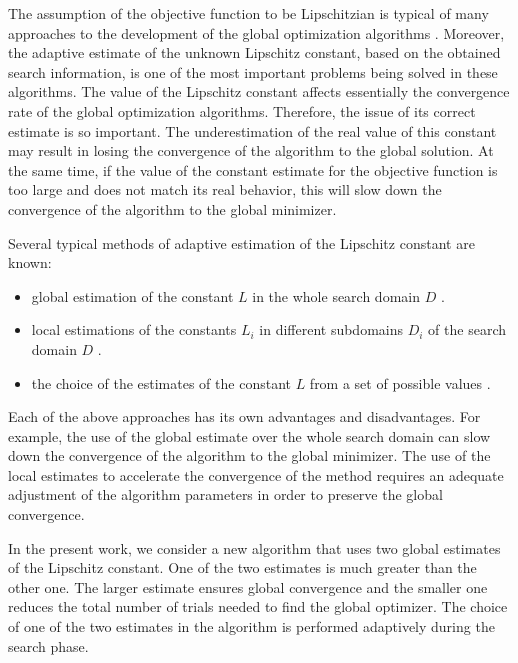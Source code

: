 \documentclass[runningheads]{llncs}
\begin{document}
The assumption of the objective function to be Lipschitzian is typical of many approaches to the development of the global optimization algorithms \cite{Evtushenko2013,Zilinskas2010,Pinter1996,Strongin2000}. Moreover, the adaptive estimate of the unknown Lipschitz constant, based on the obtained search information, is one of the most important problems being solved in these algorithms. 
The value of the Lipschitz constant affects essentially the convergence rate of the global optimization algorithms. Therefore, the issue of its correct estimate is so important. 
The underestimation of the real value of this constant may result in losing the convergence of the algorithm to the global solution. At the same time, if the value of the constant estimate for the objective function is too large and does not match its real behavior, this will slow down the convergence of the algorithm to the global minimizer. 

Several typical methods of adaptive estimation of the Lipschitz constant are known:
\begin{itemize}
	\item global estimation of the constant $L$ in the whole search domain $D$ \cite{Horst1996,Pinter1996,Strongin2000}.
	\item local estimations of the constants $L_i$ in different subdomains $D_i$ of the search domain $D$ \cite{Kvasov2003,Sergeyev2010,Sergeyev2016}.
	\item the choice of the estimates of the constant $L$ from a set of possible values \cite{Gablonsky2001,Jones1993,Sergeyev2006}.
\end{itemize}

Each of the above approaches has its own advantages and disadvantages. For example, the use of the global estimate over the whole search domain can slow down the convergence of the algorithm to the global minimizer. The use of the local estimates to accelerate the convergence of the method requires an adequate adjustment of the algorithm parameters in order to preserve the global convergence. 

In the present work, we  consider a new algorithm that uses two global estimates of the Lipschitz constant. One of the two estimates is much greater than the other one. 
The larger estimate ensures global convergence and the smaller one reduces the total number of trials needed to find the global optimizer.
The choice of one of the two estimates in the algorithm is performed adaptively during the search phase.
\end{document}

